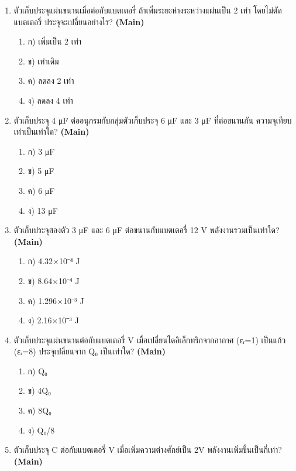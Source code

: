 \documentclass[12pt]{article}
\begin{document}
\begin{enumerate}[label=\arabic*.]
\begin{enumerate}[label=)]
\item ข) 50 V
\item ค) 100 V
\item ง) 200 V
\end{enumerate}
\item ตัวเก็บประจุแผ่นขนานเมื่อต่อกับแบตเตอรี่ ถ้าเพิ่มระยะห่างระหว่างแผ่นเป็น 2 เท่า โดยไม่ตัดแบตเตอรี่ ประจุจะเปลี่ยนอย่างไร? \hfill \textbf{\small (Main)}
\begin{enumerate}[label=)]
\item ก) เพิ่มเป็น 2 เท่า
\item ข) เท่าเดิม
\item ค) ลดลง 2 เท่า
\item ง) ลดลง 4 เท่า
\end{enumerate}
\item ตัวเก็บประจุ 4 μF ต่ออนุกรมกับกลุ่มตัวเก็บประจุ 6 μF และ 3 μF ที่ต่อขนานกัน ความจุเทียบเท่าเป็นเท่าใด? \hfill \textbf{\small (Main)}
\begin{enumerate}[label=)]
\item ก) 3 μF
\item ข) 5 μF
\item ค) 6 μF
\item ง) 13 μF
\end{enumerate}
\item ตัวเก็บประจุสองตัว 3 μF และ 6 μF ต่อขนานกับแบตเตอรี่ 12 V พลังงานรวมเป็นเท่าใด? \hfill \textbf{\small (Main)}
\begin{enumerate}[label=)]
\item ก) 4.32×10⁻⁴ J
\item ข) 8.64×10⁻⁴ J
\item ค) 1.296×10⁻³ J
\item ง) 2.16×10⁻³ J
\end{enumerate}
\item ตัวเก็บประจุแผ่นขนานต่อกับแบตเตอรี่ V เมื่อเปลี่ยนไดอิเล็กทริกจากอากาศ (εᵣ=1) เป็นแก้ว (εᵣ=8) ประจุเปลี่ยนจาก Q₀ เป็นเท่าใด? \hfill \textbf{\small (Main)}
\begin{enumerate}[label=)]
\item ก) Q₀
\item ข) 4Q₀
\item ค) 8Q₀
\item ง) Q₀/8
\end{enumerate}
\item ตัวเก็บประจุ C ต่อกับแบตเตอรี่ V เมื่อเพิ่มความต่างศักย์เป็น 2V พลังงานเพิ่มขึ้นเป็นกี่เท่า? \hfill \textbf{\small (Main)}
\begin{enumerate}[label=)]

\end{enumerate}
\end{enumerate}
\end{document}
